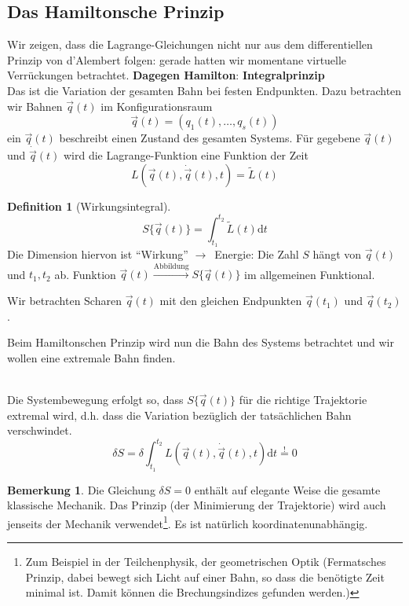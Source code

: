 \documentclass[oneside]{book}
\theoremstyle{definition}
\newtheorem*{definition*}{Definition}
\newtheorem*{bemerkung*}{Bemerkung}
\newcommand{\conseq}{$\rightarrow$~}
\renewcommand{\d}{\mathrm d}
\newcommand{\dotvec}[1]{\dot{\vec{#1}}}
\begin{document}
\subsection{Das Hamiltonsche Prinzip}	
Wir zeigen, dass die Lagrange-Gleichungen nicht nur aus dem differentiellen Prinzip von d'Alembert folgen: gerade hatten wir momentane virtuelle Verrückungen betrachtet.
\textbf{Dagegen Hamilton}: \textbf{Integralprinzip}\\
Das ist die Variation der gesamten Bahn bei festen Endpunkten.
Dazu betrachten wir Bahnen $\vec{q}(t)$ im Konfigurationsraum
$$\vec{q}(t) = (q_1(t), \dots, q_s(t))$$
ein $\vec{q}(t)$ beschreibt einen Zustand des gesamten Systems. Für gegebene $\vec{q}(t)$ und $\dot{\vec{q}}(t)$ wird die Lagrange-Funktion eine Funktion der Zeit 
$$L(\vec{q}(t), \dotvec{q}(t), t) = \tilde{L}(t)$$

\begin{definition*}[Wirkungsintegral]
$$S\{\vec{q}(t)\} = \int_{t_1}^{t_2} \tilde{L}(t) \d t$$
Die Dimension hiervon ist "`Wirkung"' \conseq Energie: Die Zahl
$S$ hängt von $\vec{q}(t)$ und $t_1, t_2$ ab. 
Funktion $\vec{q}(t) \xrightarrow{\text{Abbildung}} S \{ \vec{q}(t) \}$ im allgemeinen Funktional.

Wir betrachten Scharen $\vec{q}(t)$ mit den gleichen Endpunkten $\vec{q}(t_1)$ und $\vec{q}(t_2)$.	
\end{definition*}


Beim Hamiltonschen Prinzip wird nun die Bahn des Systems betrachtet und wir wollen eine extremale Bahn finden.

~\\
Die Systembewegung erfolgt so, dass $S\{\vec{q}(t)\}$ für die richtige Trajektorie extremal wird, d.h. dass die Variation bezüglich der tatsächlichen Bahn verschwindet.
$$\delta S = \delta \int_{t_1}^{t_2} L(\vec{q}(t), \dotvec{q}(t), t) \d t \overset{!}{=} 0$$

\begin{bemerkung*}
	Die Gleichung $\delta S = 0$ enthält auf elegante Weise die gesamte klassische Mechanik. Das Prinzip (der Minimierung der Trajektorie) wird auch jenseits der Mechanik verwendet\footnote{Zum Beispiel in der Teilchenphysik, der geometrischen Optik (Fermatsches Prinzip, dabei bewegt sich Licht auf einer Bahn, so dass die benötigte Zeit minimal ist. Damit können die Brechungsindizes gefunden werden.)}. Es ist natürlich koordinatenunabhängig.
\end{bemerkung*}
\end{document}
